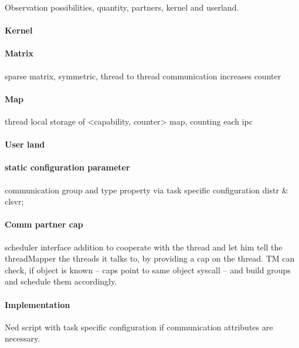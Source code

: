 Observation possibilities, quantity, partners, kernel and userland. 

\paragraph{Kernel}
\paragraph{Matrix}
sparse matrix, symmetric, thread to thread communication increases counter
\paragraph{Map}
thread local storage of <capability, counter> map, counting each \gls{ipc}

\paragraph{User land}
\paragraph{static configuration parameter}
communication group and type property via task specific configuration
distr \& clsvr;
\paragraph{Comm partner cap}
scheduler interface addition to cooperate with the thread and let him tell the
threadMapper the threads it talks to, by providing a cap on the thread.
TM can check, if object is known -- caps point to same object syscall -- and
build groups and schedule them accordingly. 


\paragraph{Implementation}
Ned script with task specific configuration if communication attributes are
necessary.
